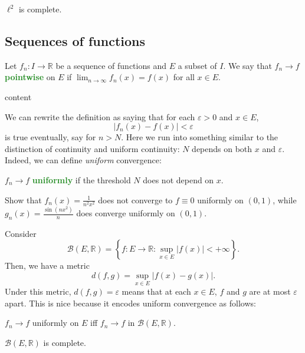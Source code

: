 \documentclass[10pt]{scrartcl}
\providecommand{\eps}{\varepsilon}
\providecommand{\RR}{\mathbb R}
\providecommand{\vocab}[1]{{\textbf{\textcolor{ForestGreen}{#1}}}}
\begin{document}
\begin{theorem}\label{wk10:thm:l2-complete}
	$\ell^2$ is complete.
\end{theorem}

\subsection{Sequences of functions}
\begin{definition}\label{wk10:def:ptwise-conv}
	Let $f_n: I\to\RR$ be a sequence of functions
	and $E$ a subset of $I$.
	We say that $f_n\to f$ \vocab{pointwise} on $E$ if
	$\lim_{n\to\infty} f_n(x) = f(x)$ for all $x\in E$.
\end{definition}

\begin{example}
	content
\end{example}

We can rewrite the definition as saying that
for each $\eps > 0$ and $x\in E$,
\[|f_n(x) - f(x)| < \eps\]
is true eventually, say for $n > N$.
Here we run into something similar to the distinction of
continuity and uniform continuity: $N$ depends on both $x$ and $\eps$.
Indeed, we can define \emph{uniform} convergence:
\begin{definition}\label{wk10:def:unif-conv-func}
	$f_n\to f$ \vocab{uniformly} if the threshold $N$
	does not depend on $x$.
\end{definition}

\begin{exercise}
	Show that $f_n(x) = \frac{1}{n^2x^2}$ does not converge to $f\equiv0$
	uniformly on $(0,1)$,
	while $g_n(x) = \frac{\sin(nx^2)}{n}$ does converge uniformly on $(0,1)$.
\end{exercise}

Consider
\[\mathcal B(E,\RR) = \left\{f\colon E\to\RR :
\sup_{x\in E} |f(x)| < +\infty \right\}.\]
Then, we have a metric
\[d(f, g) = \sup_{x\in E} |f(x) - g(x)|.\]
Under this metric, $d(f, g) = \eps$ means that
at each $x\in E$, $f$ and $g$ are at most $\eps$ apart.
This is nice because it encodes uniform convergence as follows:
\begin{lemma}
	$f_n\to f$ uniformly on $E$ iff
	$f_n\to f$ in $\mathcal B(E,\RR)$.
\end{lemma}

\begin{theorem}
	$\mathcal B(E,\RR)$ is complete.
\end{theorem}
\end{document}
